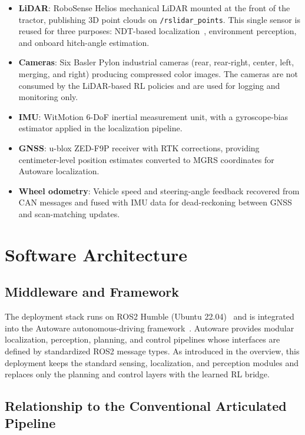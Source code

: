 \begin{itemize}
    \item \textbf{LiDAR}: RoboSense Helios mechanical LiDAR mounted at the front of the tractor, publishing 3D point clouds on \texttt{/rslidar\_points}. This single sensor is reused for three purposes: NDT-based localization~\cite{biber2003ndt}, environment perception, and onboard hitch-angle estimation.
    \item \textbf{Cameras}: Six Basler Pylon industrial cameras (rear, rear-right, center, left, merging, and right) producing compressed color images. The cameras are not consumed by the LiDAR-based RL policies and are used for logging and monitoring only.
    \item \textbf{IMU}: WitMotion 6-DoF inertial measurement unit, with a gyroscope-bias estimator applied in the localization pipeline.
    \item \textbf{GNSS}: u-blox ZED-F9P receiver with RTK corrections, providing centimeter-level position estimates converted to MGRS coordinates for Autoware localization.
    \item \textbf{Wheel odometry}: Vehicle speed and steering-angle feedback recovered from CAN messages and fused with IMU data for dead-reckoning between GNSS and scan-matching updates.
\end{itemize}

\section{Software Architecture}

\subsection{Middleware and Framework}

The deployment stack runs on ROS2 Humble (Ubuntu 22.04)~\cite{macenski2022ros2} and is integrated into the Autoware autonomous-driving framework~\cite{kato2018autoware}. Autoware provides modular localization, perception, planning, and control pipelines whose interfaces are defined by standardized ROS2 message types. As introduced in the overview, this deployment keeps the standard sensing, localization, and perception modules and replaces only the planning and control layers with the learned RL bridge.

\subsection{Relationship to the Conventional Articulated Pipeline}


